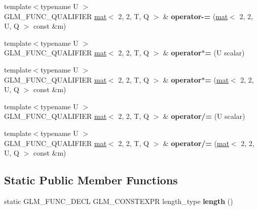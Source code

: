 \begin{DoxyCompactItemize}
\item 
\mbox{\label{structglm_1_1mat_3_012_00_012_00_01T_00_01Q_01_4_aeecbe99c8dd463d2a57ddd006608f5d0}} 
{\footnotesize template$<$typename U $>$ }\\G\+L\+M\+\_\+\+F\+U\+N\+C\+\_\+\+Q\+U\+A\+L\+I\+F\+I\+ER \hyperlink{structglm_1_1mat}{mat}$<$ 2, 2, T, Q $>$ \& {\bfseries operator-\/=} (\hyperlink{structglm_1_1mat}{mat}$<$ 2, 2, U, Q $>$ const \&m)
\item 
\mbox{\label{structglm_1_1mat_3_012_00_012_00_01T_00_01Q_01_4_abd40e7f277b38fb6d4bc253c5750ac22}} 
{\footnotesize template$<$typename U $>$ }\\G\+L\+M\+\_\+\+F\+U\+N\+C\+\_\+\+Q\+U\+A\+L\+I\+F\+I\+ER \hyperlink{structglm_1_1mat}{mat}$<$ 2, 2, T, Q $>$ \& {\bfseries operator$\ast$=} (U scalar)
\item 
\mbox{\label{structglm_1_1mat_3_012_00_012_00_01T_00_01Q_01_4_a1abaf7d5f1778b770aea62171ba17a29}} 
{\footnotesize template$<$typename U $>$ }\\G\+L\+M\+\_\+\+F\+U\+N\+C\+\_\+\+Q\+U\+A\+L\+I\+F\+I\+ER \hyperlink{structglm_1_1mat}{mat}$<$ 2, 2, T, Q $>$ \& {\bfseries operator$\ast$=} (\hyperlink{structglm_1_1mat}{mat}$<$ 2, 2, U, Q $>$ const \&m)
\item 
\mbox{\label{structglm_1_1mat_3_012_00_012_00_01T_00_01Q_01_4_a00e71864537d53ed26be1183b6930117}} 
{\footnotesize template$<$typename U $>$ }\\G\+L\+M\+\_\+\+F\+U\+N\+C\+\_\+\+Q\+U\+A\+L\+I\+F\+I\+ER \hyperlink{structglm_1_1mat}{mat}$<$ 2, 2, T, Q $>$ \& {\bfseries operator/=} (U scalar)
\item 
\mbox{\label{structglm_1_1mat_3_012_00_012_00_01T_00_01Q_01_4_a2ccd7dd34be3dad08262d075de391ed8}} 
{\footnotesize template$<$typename U $>$ }\\G\+L\+M\+\_\+\+F\+U\+N\+C\+\_\+\+Q\+U\+A\+L\+I\+F\+I\+ER \hyperlink{structglm_1_1mat}{mat}$<$ 2, 2, T, Q $>$ \& {\bfseries operator/=} (\hyperlink{structglm_1_1mat}{mat}$<$ 2, 2, U, Q $>$ const \&m)
\end{DoxyCompactItemize}
\subsection*{Static Public Member Functions}
\begin{DoxyCompactItemize}
\item 
\mbox{\label{structglm_1_1mat_3_012_00_012_00_01T_00_01Q_01_4_a7b681dcae80386d30308def77cd2646e}} 
static G\+L\+M\+\_\+\+F\+U\+N\+C\+\_\+\+D\+E\+CL G\+L\+M\+\_\+\+C\+O\+N\+S\+T\+E\+X\+PR length\+\_\+type {\bfseries length} ()
\end{DoxyCompactItemize}
